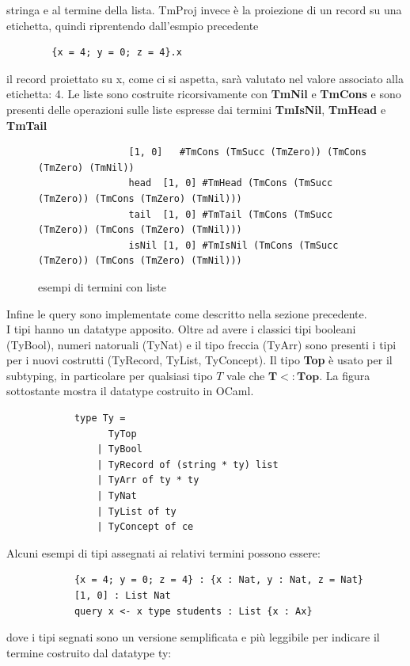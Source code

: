         stringa e al termine della lista. TmProj invece è la proiezione di un record su una etichetta, quindi riprentendo dall'esmpio precedente 
        \begin{verbatim}
        {x = 4; y = 0; z = 4}.x
        \end{verbatim}
        il record proiettato su x, come ci si aspetta, sarà valutato nel valore associato alla etichetta: 4.
        Le liste sono costruite ricorsivamente con \textbf{TmNil} e \textbf{TmCons} e sono presenti delle operazioni sulle liste espresse dai termini \textbf{TmIsNil},
        \textbf{TmHead} e \textbf{TmTail}
        \begin{figure}[h]
            \begin{verbatim}
                [1, 0]   #TmCons (TmSucc (TmZero)) (TmCons (TmZero) (TmNil))
                head  [1, 0] #TmHead (TmCons (TmSucc (TmZero)) (TmCons (TmZero) (TmNil)))
                tail  [1, 0] #TmTail (TmCons (TmSucc (TmZero)) (TmCons (TmZero) (TmNil)))
                isNil [1, 0] #TmIsNil (TmCons (TmSucc (TmZero)) (TmCons (TmZero) (TmNil)))
            \end{verbatim}
        \caption{esempi di termini con liste}
        \end{figure}
        Infine le query sono implementate come descritto nella sezione precedente.
        \\I tipi hanno un datatype apposito. Oltre ad avere i classici tipi booleani (TyBool), numeri natoruali (TyNat) e il tipo freccia (TyArr) 
        sono presenti i tipi per i nuovi costrutti (TyRecord, TyList, TyConcept). Il tipo \textbf{Top} è usato per il subtyping, in particolare per
        qualsiasi tipo $T$ vale che $\boldsymbol{T <: Top}$. La figura sottostante mostra il datatype costruito in OCaml.
        \begin{verbatim}
            type Ty =
                  TyTop 
                | TyBool 
                | TyRecord of (string * ty) list 
                | TyArr of ty * ty 
                | TyNat 
                | TyList of ty
                | TyConcept of ce
        \end{verbatim}
        Alcuni esempi di tipi assegnati ai relativi termini possono essere:
        \begin{verbatim}
            {x = 4; y = 0; z = 4} : {x : Nat, y : Nat, z = Nat}
            [1, 0] : List Nat
            query x <- x type students : List {x : Ax}
        \end{verbatim}
        dove i tipi segnati sono un versione semplificata e più leggibile per indicare il termine costruito dal datatype ty:
